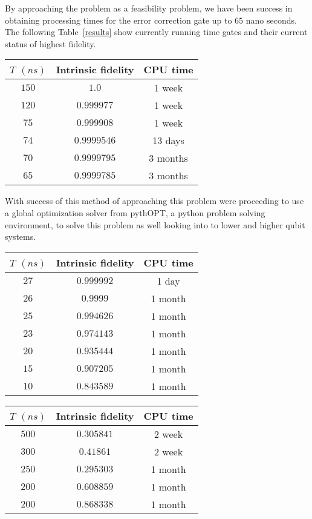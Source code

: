 By approaching the problem as a feasibility problem, we have been success in obtaining processing times for the error correction gate up to $65$ nano seconds. The following Table~\ref{results} show currently running time gates and their current status of highest fidelity.  

\begin{table}
\centering
\begin{tabular}{c|c|c}
\hline  $T$ $(ns)$  & Intrinsic fidelity & CPU time \\
\hline
$150$ &$1.0$      &1 week\\
$120$ &$0.999977$ &1 week \\
$75$  &$0.999908$ &1 week\\
$74$  & $0.9999546$ & 13 days\\
$70$  & $0.9999795$ & 3 months \\
$65$  & $0.9999785$ & 3 months \\ \hline

\end{tabular}
\end{table}

With success of this method of approaching this problem were proceeding to use a global optimization solver from pythOPT, a python problem solving environment, to solve this problem as well looking into to lower and higher qubit systems. 


\begin{table}
\centering
\begin{tabular}{c|c|c}
\hline  $T$ $(ns)$  & Intrinsic fidelity & CPU time \\
\hline
$27$  & $0.999992$ &1 day \\
$26$  & $0.9999  $ &1 month\\
$25$  & $0.994626$ &1 month\\
$23$  & $0.974143$ & 1 month \\
$20$  & $0.935444$ & 1 month\\
$15$  & $0.907205$ & 1 month\\
$10$  & $0.843589$ & 1 month \\ \hline


\end{tabular}
\end{table}

\begin{table}
\centering
\begin{tabular}{c|c|c}
\hline  $T$ $(ns)$  & Intrinsic fidelity & CPU time \\
\hline
$500$  &$0.305841$ &2 week\\
$300$  &$0.41861$  &2 week \\
$250$  &$0.295303$ &1 month\\
$200$  &$0.608859$ &1 month\\
$200$  &$0.868338$ &1 month\\ \hline


\end{tabular}
\end{table}

